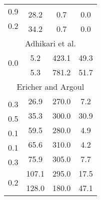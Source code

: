\documentclass[11pt]{article}
\begin{document}
\begin{table}
\begin{tabular}{|c|c|c|c|}
\multirow{2}{*}{0.9} & & & \\ \cline{2-4} 
 & \multirow{2}{*}{28.2} & \multirow{2}{*}{0.7} & \multirow{2}{*}{0.0} \\ \cline{1-1}
\multirow{2}{*}{0.2} & & & \\ \cline{2-4} 
 & \multirow{2}{*}{34.2} & \multirow{2}{*}{0.7} & \multirow{2}{*}{0.0} \\ \cline{1-1}
 & & & \\ \hline \hline
\multicolumn{4}{|c|}{\multirow{2}{*}{Adhikari et al.}} \\
\multicolumn{4}{|c|}{} \\ \hline
 & \multirow{2}{*}{5.2} & \multirow{2}{*}{423.1} & \multirow{2}{*}{49.3} \\ \cline{1-1}
\multirow{2}{*}{0.0} & & & \\ \cline{2-4} 
 & \multirow{2}{*}{5.3} & \multirow{2}{*}{781.2} & \multirow{2}{*}{51.7} \\ \cline{1-1}
 & & & \\ \hline \hline
\multicolumn{4}{|c|}{\multirow{2}{*}{Ericher and Argoul}} \\
\multicolumn{4}{|c|}{} \\ \hline
 & \multirow{2}{*}{26.9} & \multirow{2}{*}{270.0} & \multirow{2}{*}{7.2} \\ \cline{1-1}
\multirow{2}{*}{0.3} & & & \\ \cline{2-4} 
 & \multirow{2}{*}{35.3} & \multirow{2}{*}{300.0} & \multirow{2}{*}{30.9} \\ \cline{1-1}
\multirow{2}{*}{0.5} & & & \\ \cline{2-4} 
 & \multirow{2}{*}{59.5} & \multirow{2}{*}{280.0} & \multirow{2}{*}{4.9} \\ \cline{1-1}
\multirow{2}{*}{0.1} & & & \\ \cline{2-4} 
 & \multirow{2}{*}{65.6} & \multirow{2}{*}{310.0} & \multirow{2}{*}{4.2} \\ \cline{1-1}
\multirow{2}{*}{0.1} & & & \\ \cline{2-4} 
 & \multirow{2}{*}{75.9} & \multirow{2}{*}{305.0} & \multirow{2}{*}{7.7} \\ \cline{1-1}
\multirow{2}{*}{0.3} & & & \\ \cline{2-4} 
 & \multirow{2}{*}{107.1} & \multirow{2}{*}{295.0} & \multirow{2}{*}{17.5} \\ \cline{1-1}
\multirow{2}{*}{0.2} & & & \\ \cline{2-4} 
 & \multirow{2}{*}{128.0} & \multirow{2}{*}{180.0} & \multirow{2}{*}{47.1} \\ \cline{1-1}

\end{tabular}
\end{table}
\end{document}

